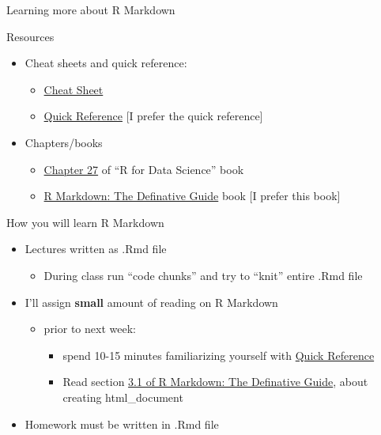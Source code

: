 \documentclass[8pt,ignorenonframetext,dvipsnames]{beamer}
\providecommand{\tightlist}{%
  \setlength{\itemsep}{0pt}\setlength{\parskip}{0pt}}
\renewcommand{\textbf}[1]{{\color{darkgray}\bfseries\fontfamily{Montserrat-TOsF}#1}}
\let\olditem\item
\renewcommand{\item}{%
  \olditem\vspace{4pt}
}
\begin{document}
\begin{frame}{Learning more about R Markdown}

Resources

\begin{itemize}
\tightlist
\item
  Cheat sheets and quick reference:

  \begin{itemize}
  \tightlist
  \item
    \href{https://www.rstudio.com/wp-content/uploads/2015/02/rmarkdown-cheatsheet.pdf}{Cheat
    Sheet}
  \item
    \href{https://www.rstudio.com/wp-content/uploads/2015/03/rmarkdown-reference.pdf}{Quick
    Reference} {[}I prefer the quick reference{]}
  \end{itemize}
\item
  Chapters/books

  \begin{itemize}
  \tightlist
  \item
    \href{http://r4ds.had.co.nz/r-markdown.html}{Chapter 27} of ``R for
    Data Science'' book
  \item
    \href{https://bookdown.org/yihui/rmarkdown/}{R Markdown: The
    Definative Guide} book {[}I prefer this book{]}
  \end{itemize}
\end{itemize}

How you will learn R Markdown

\begin{itemize}
\tightlist
\item
  Lectures written as .Rmd file

  \begin{itemize}
  \tightlist
  \item
    During class run ``code chunks'' and try to ``knit'' entire .Rmd
    file
  \end{itemize}
\item
  I'll assign \textbf{small} amount of reading on R Markdown

  \begin{itemize}
  \tightlist
  \item
    prior to next week:

    \begin{itemize}
    \tightlist
    \item
      spend 10-15 minutes familiarizing yourself with
      \href{https://www.rstudio.com/wp-content/uploads/2015/03/rmarkdown-reference.pdf}{Quick
      Reference}
    \item
      Read section
      \href{https://bookdown.org/yihui/rmarkdown/html-document.html}{3.1
      of R Markdown: The Definative Guide}, about creating
      html\_document
    \end{itemize}
  \end{itemize}
\item
  Homework must be written in .Rmd file


\end{itemize}
\end{frame}
\end{document}

